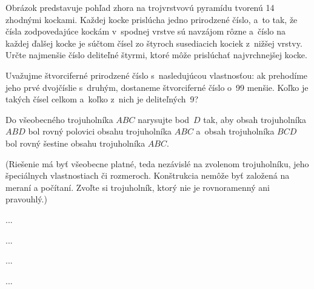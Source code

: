 {%
Obrázok predstavuje pohľad zhora na trojvrstvovú pyramídu tvorenú 14 zhodnými kockami.
Každej kocke prislúcha jedno prirodzené číslo, a~to tak, že čísla zodpovedajúce kockám v~spodnej vrstve sú navzájom rôzne a~číslo na každej ďalšej kocke je súčtom čísel zo štyroch susediacich kociek z~nižšej vrstvy.
Určte najmenšie číslo deliteľné štyrmi, ktoré môže prislúchať najvrchnejšej kocke.
\ifobrazkyvedla\else{}\fi%
}

{%
Uvažujme štvorciferné prirodzené číslo s~nasledujúcou vlastnosťou: ak prehodíme jeho prvé dvojčíslie s~druhým, dostaneme štvorciferné číslo o~99 menšie.
Koľko je takých čísel celkom a~koľko z~nich je deliteľných~9?
}

{%
Do všeobecného trojuholníka $ABC$ narysujte bod~$D$ tak, aby obsah trojuholníka $ABD$ bol rovný polovici obsahu trojuholníka $ABC$ a~obsah trojuholníka $BCD$ bol rovný šestine obsahu trojuholníka $ABC$.

(Riešenie má byť všeobecne platné, teda nezávislé na zvolenom trojuholníku, jeho špeciálnych vlastnostiach či rozmeroch. Konštrukcia nemôže byť založená na meraní a počítaní. Zvoľte si trojuholník, ktorý nie je rovnoramenný ani pravouhlý.)
}

{%
...}

{%
...}

{%
...}

{%
...}

